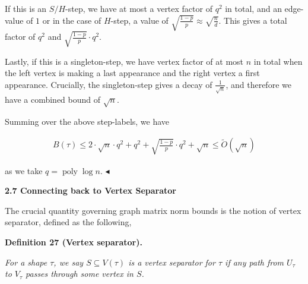 \documentclass[10pt,a4paper]{article}
\begin{document}
If this is an $S/H$-step, we have at most a vertex factor of $q^{2}$ in total, and an edge-value of $1$ or in the case of $H$-step, a value of $\sqrt{\frac{1-p}{p}}\approx\sqrt{\frac{n}{d}}$. This gives a total factor of $q^{2}$ and $\sqrt{\frac{1-p}{p}}\cdot q^{2}$.\par




Lastly, if this is a singleton-step, we have vertex factor of at most $n$ in total when the left vertex is making a last appearance and the right vertex a first appearance. Crucially, the singleton-step gives a decay of $\frac{1}{\sqrt{n}}$, and therefore we have a combined bound of $\sqrt{n}$.\par




Summing over the above step-labels, we have\par


\[\begin{gathered}
B(\tau)\leq 2\cdot\sqrt{n}\cdot q^{2}+q^{2}+\sqrt{\frac{1-p}{p}}\cdot q^{2}+\sqrt{n}\leq\tilde{O}(\sqrt{n})
\end{gathered}\]


as we take $q=\operatorname{poly}\log n$.
$\blacktriangleleft$\par






\par\medskip\noindent\textbf{
2.7 Connecting back to Vertex Separator}\par




The crucial quantity governing graph matrix norm bounds is the notion of vertex separator, defined as the following,\par





\par\medskip\noindent\textbf{
\textbf{Definition 27}\textbf{ }(Vertex separator)\textbf{.}
}\par



\emph{For a shape $\tau$, we say $S\subseteq V(\tau)$ is a vertex separator for $\tau$ if any path from $U_{\tau}$ to $V_{\tau}$ passes through some vertex in $S$.}\par



\end{document}
